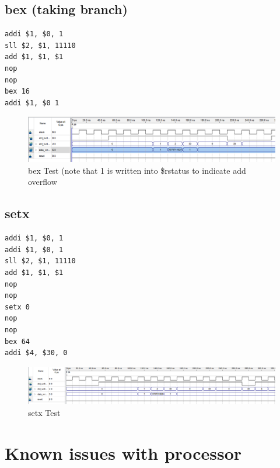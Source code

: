 \documentclass[letterpaper]{article} %
\begin{document}
    
\subsection{bex (taking branch)}
\begin{verbatim}
addi $1, $0, 1
sll $2, $1, 11110
add $1, $1, $1
nop
nop
bex 16
addi $1, $0 1

\end{verbatim}
   \FloatBarrier
  \begin{figure}[!htb]
        \includegraphics[scale=.5]{bexTest2.PNG}
        \caption{bex Test (note that 1 is written into \$rstatus to indicate add overflow}
        \label{fig:2}
    \end{figure}
       \FloatBarrier
    
    
    \pagebreak
\subsection{setx}
\begin{verbatim}
addi $1, $0, 1
addi $1, $0, 1
sll $2, $1, 11110
add $1, $1, $1
nop
nop
setx 0
nop
nop
bex 64
addi $4, $30, 0

\end{verbatim}

  \begin{figure}[!htb]
        \includegraphics[scale=.45]{setxTest.PNG}
        \caption{setx Test}
        \label{fig:2}
    \end{figure}
    


\section{Known issues with processor}
\end{document}

